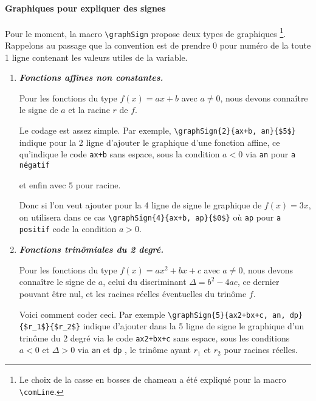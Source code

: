 \documentclass[12pt,a4paper]{article}
\newcommand\env[1]{\texttt{#1}}
\newcommand\macro[1]{\env{\textbackslash{}#1}}
\theoremstyle{definition}
\newcommand\prefix[1]{%
	\texttt{#1}%
}
\begin{document}


\paragraph{Graphiques pour expliquer des signes}

Pour le moment, la macro \macro{graphSign} propose deux types de graphiques
\footnote{
    Le choix de la casse en bosses de chameau a été expliqué pour la macro \macro{comLine}.
}.
Rappelons au passage que la convention est de prendre $0$ pour numéro de la toute 1\iere{} ligne contenant les valeurs utiles de la variable.

\begin{enumerate}
    \item \textbf{\itshape Fonctions affines non constantes.}
          
          \smallskip

          Pour les fonctions du type $f(x) = a x + b$ avec $a \neq 0$, nous devons connaître le signe de $a$ et la racine $r$ de $f$.
          
          \smallskip

          Le codage est assez simple.
          Par exemple, \verb#\graphSign{2}{ax+b, an}{$5$}# indique pour la 2\ieme{} ligne d'ajouter le graphique
          d'une fonction affine, ce qu'indique le code \verb#ax+b# sans espace,
          sous la condition $a < 0$ via \prefix{an} pour \prefix{a négatif}
          et enfin avec $5$ pour racine.
          
          \smallskip

          Donc si l'on veut ajouter pour la 4\ieme{} ligne de signe le graphique de $f(x) = 3x$, on utilisera dans ce cas \verb#\graphSign{4}{ax+b, ap}{$0$}# où \prefix{ap} pour \prefix{a positif} code la condition $a > 0$.




    \medskip
    \item \textbf{\itshape Fonctions trinômiales du 2\ieme{} degré.}
          
          \smallskip

          Pour les fonctions du type $f(x) = a x^2 + b x + c$ avec $a \neq 0$, nous devons connaître le signe de $a$, celui du discriminant $\Delta = b^2 - 4ac$, ce dernier pouvant être nul, et les racines réelles éventuelles du trinôme $f$.

          \smallskip

          Voici comment coder ceci.
          Par exemple \verb#\graphSign{5}{ax2+bx+c, an, dp}{$r_1$}{$r_2$}# indique d'ajouter dans la 5\ieme{} ligne de signe le graphique 
          d'un trinôme du 2\ieme{} degré via le code \verb#ax2+bx+c# sans espace,
          sous les conditions $a < 0$ et $\Delta > 0$ via \prefix{an} et \prefix{dp},
          le trinôme ayant $r_1$ et $r_2$ pour racines réelles.


\end{enumerate}
\end{document}
